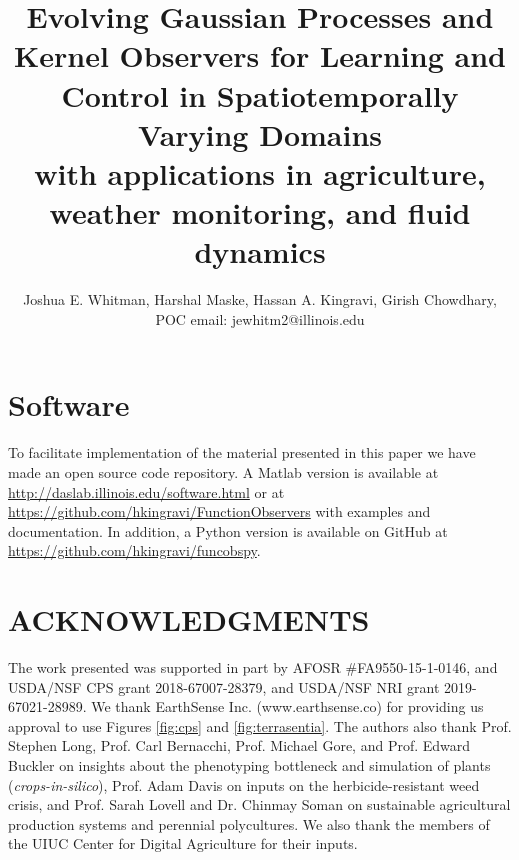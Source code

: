 \documentclass[letterpaper,12pt,peerreviewca,draftcls]{IEEEtran}
\title{Evolving Gaussian Processes and Kernel Observers for Learning and Control in Spatiotemporally Varying Domains\\\Large with applications in agriculture, weather monitoring, and fluid dynamics}
\author{Joshua E. Whitman, Harshal Maske, Hassan A. Kingravi, Girish Chowdhary, \\ POC email: jewhitm2@illinois.edu}
\newcommand{\XX}[1]{{\bf XX #1 XX}}
\begin{document}
\maketitle
\CSMsetup
\linenumbers \modulolinenumbers[5] %








\section{Software}
To facilitate implementation of the material presented in this paper we have made an open source code repository. A Matlab version is available at \url{http://daslab.illinois.edu/software.html} or at \url{https://github.com/hkingravi/FunctionObservers} with examples and documentation. In addition, a Python version is available on GitHub at \url{https://github.com/hkingravi/funcobspy}.

\section{ACKNOWLEDGMENTS}
The work presented was supported in part by AFOSR \#FA9550-15-1-0146, %
and USDA/NSF CPS grant 2018-67007-28379, and USDA/NSF NRI grant 2019-67021-28989.  We thank EarthSense Inc. (www.earthsense.co) for providing us approval to use Figures \ref{fig:cps} and \ref{fig:terrasentia}. The authors also thank Prof. Stephen Long, Prof. Carl Bernacchi, Prof. Michael Gore, and Prof. Edward Buckler on insights about the phenotyping bottleneck and simulation of plants (\textit{crops-in-silico}), Prof. Adam Davis on inputs on the herbicide-resistant weed crisis, and Prof. Sarah Lovell and Dr. Chinmay Soman on sustainable agricultural production systems and perennial polycultures. We also thank the members of the UIUC Center for Digital Agriculture for their inputs.

%


\clearpage


\end{document}

